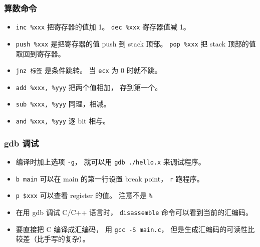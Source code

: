 \subsubsection{算数命令}
\begin{itemize}
\item \verb`inc %xxx` 把寄存器的值加 1。 \verb`dec %xxx` 寄存器值减 1。
\item \verb`push %xxx` 是把寄存器的值 push 到 stack 顶部。 \verb`pop %xxx` 把 stack 顶部的值取回到寄存器。
\item \verb`jnz 标签` 是条件跳转。 当 \verb`ecx` 为 0 时就不跳。
\item \verb`add %xxx, %yyy` 把两个值相加， 存到第一个。
\item \verb`sub %xxx, %yyy` 同理，相减。
\item \verb`and %xxx, %yyy` 逐 bit 相与。
\end{itemize}

\subsubsection{gdb 调试}
\begin{itemize}
\item 编译时加上选项 \verb`-g`， 就可以用 \verb`gdb ./hello.x` 来调试程序。
\item \verb`b main` 可以在 main 的第一行设置 break point， \verb`r` 跑程序。
\item \verb`p $xxx` 可以查看 register 的值。 注意不是 \verb`%`
\item 在用 gdb 调试 C/C++ 语言时， \verb`disassemble` 命令可以看到当前的汇编码。
\item 要直接把 C 编译成汇编码， 用 \verb`gcc -S main.c`， 但是生成汇编码的可读性比较差（比手写的复杂）。
\end{itemize}

